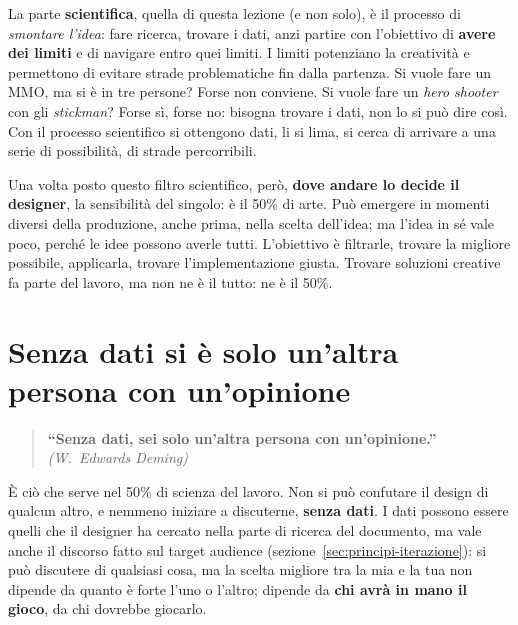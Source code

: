 La parte \textbf{scientifica}, quella di questa lezione (e non solo), è il
processo di \emph{smontare l'idea}: fare ricerca, trovare i dati, anzi partire
con l'obiettivo di \textbf{avere dei limiti} e di navigare entro quei limiti.
I limiti potenziano la creatività e permettono di evitare strade
problematiche fin dalla partenza. Si vuole fare un MMO, ma si è in tre
persone? Forse non conviene. Si vuole fare un \emph{hero shooter} con gli
\emph{stickman}? Forse sì, forse no: bisogna trovare i dati, non lo si può
dire così. Con il processo scientifico si ottengono dati, li si lima, si
cerca di arrivare a una serie di possibilità, di strade percorribili.

Una volta posto questo filtro scientifico, però, \textbf{dove andare lo
decide il designer}, la sensibilità del singolo: è il 50\% di arte. Può
emergere in momenti diversi della produzione, anche prima, nella scelta
dell'idea; ma l'idea in sé vale poco, perché le idee possono averle tutti.
L'obiettivo è filtrarle, trovare la migliore possibile, applicarla, trovare
l'implementazione giusta. Trovare soluzioni creative fa parte del lavoro, ma
non ne è il tutto: ne è il 50\%.

\section{Senza dati si è solo un'altra persona con un'opinione}
\label{sec:dati}



\begin{quote}
\centering
\textbf{``Senza dati, sei solo un'altra persona con un'opinione.''}\\
\emph{(W.~Edwards Deming)}
\end{quote}

È ciò che serve nel 50\% di scienza del lavoro. Non si può confutare il
design di qualcun altro, e nemmeno iniziare a discuterne, \textbf{senza dati}.
I dati possono essere quelli che il designer ha cercato nella parte di
ricerca del documento, ma vale anche il discorso fatto sul target audience
(sezione~\ref{sec:principi-iterazione}): si può discutere di qualsiasi cosa,
ma la scelta migliore tra la mia e la tua non dipende da quanto è forte l'uno
o l'altro; dipende da \textbf{chi avrà in mano il gioco}, da chi dovrebbe
giocarlo.

